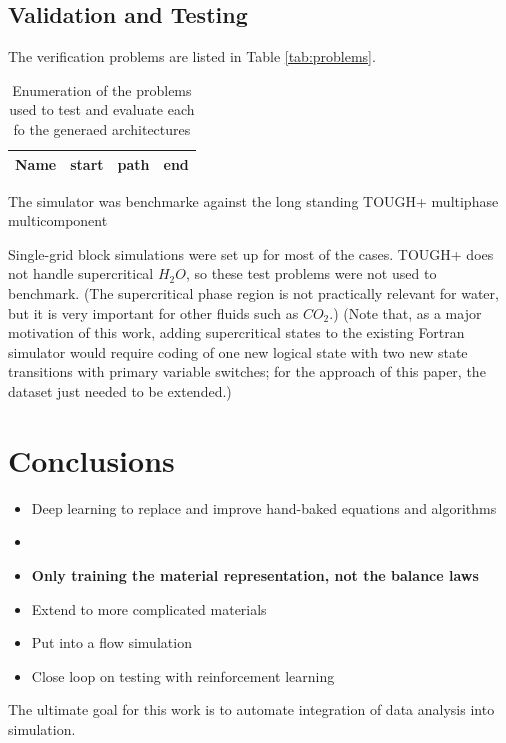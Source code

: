 \documentclass[]{article}
\begin{document}
\hypertarget{header-n3418}{%
\subsection{Validation and Testing}\label{header-n3418}}

The verification problems are listed in Table \ref{tab:problems}.
\begin{table}
  \caption{\label{tag:problems}Enumeration of the problems used to test and evaluate each fo the generaed architectures}
\begin{tabular}{l|c|c|c}
  Name & start & path & end\\
\hline
\end{tabular}
\end{table}
The simulator was benchmarke against the long standing TOUGH+ multiphase
multicomponent

Single-grid block simulations were set up for most of the cases. TOUGH+
does not handle supercritical \(H_2O\), so these test problems were not
used to benchmark. (The supercritical phase region is not practically
relevant for water, but it is very important for other fluids such as
\(CO_2\).) (Note that, as a major motivation of this work, adding
supercritical states to the existing Fortran simulator would require
coding of one new logical state with two new state transitions with
primary variable switches; for the approach of this paper, the dataset
just needed to be extended.)


\hypertarget{header-n3421}{%
\section{Conclusions}\label{header-n3421}}

\begin{itemize}
\item
  Deep learning to replace and improve hand-baked equations and
  algorithms
\item
\item
  \textbf{Only training the material representation, not the balance
  laws}
\item
  Extend to more complicated materials
\item
  Put into a flow simulation
\item
  Close loop on testing with reinforcement learning
\end{itemize}

The ultimate goal for this work is to automate integration of data
analysis into simulation.
\end{document}
